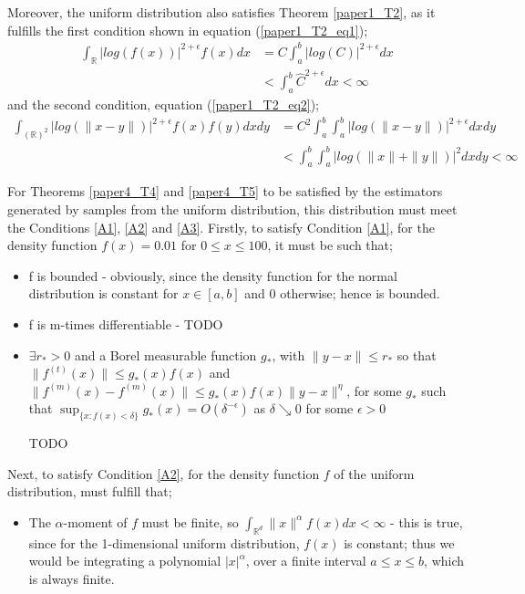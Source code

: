 \documentclass{article}
\begin{document}
Moreover, the uniform distribution also satisfies Theorem \ref{paper1_T2}, as it fulfills the first condition shown in equation (\ref{paper1_T2_eq1});
\begin{align} \nonumber
\int_{\mathbb{R}} | log(f(x))|^{2 + \epsilon} f(x) dx  &= C \int_{a}^{b} | log  (C)|^{2 + \epsilon} dx \\ \nonumber
&< \int_{a}^{b} \hat{C}^{2 + \epsilon} dx < \infty \nonumber
\end{align}
and the second condition, equation (\ref{paper1_T2_eq2});
\begin{align} \nonumber
\int_{(\mathbb{R})^2} | log(\|x-y\|)|^{2+ \epsilon} f(x) f(y) dx dy  &= C^2 \int_{a}^{b} \int_{a}^{b}| log(\|x-y\|)|^{2+ \epsilon} dx dy \\ \nonumber
&< \int_{a}^{b} \int_{a}^{b} | log(\|x\| + \|y\|)|^2 dx dy < \infty \nonumber
\end{align}

For Theorems \ref{paper4_T4} and \ref{paper4_T5} to be satisfied by the estimators generated by samples from the uniform distribution, this distribution must meet the Conditions \ref{A1}, \ref{A2} and \ref{A3}. 
Firstly, to satisfy Condition \ref{A1}, for the density function $f(x) = 0.01$ for $0 \leq x \leq 100$, it must be such that;
\begin{itemize}
\item f is bounded - obviously, since the density function for the normal distribution is constant for $x \in [a, b]$ and $0$ otherwise; hence is bounded.

\item f is m-times differentiable - TODO

\item $\exists r_{*} > 0$ and a Borel measurable function $g_{*}$, with $\|y-x\| \leq r_{*}$ so that $\|f^{(t)}(x)\| \leq g_{*}(x) f(x)$ and $\|f^{(m)}(x) - f^{(m)}(x)\| \leq g_{*}(x) f(x)\|y - x\|^{\eta}$, for some $g_{*}$ such that $\sup_{\{x : f(x) < \delta\}} g_{*}(x) = O(\delta^{-\epsilon})$ as $\delta \searrow 0$ for some $\epsilon >0$

TODO

\end{itemize}

Next, to satisfy Condition \ref{A2}, for the density function $f$ of the uniform distribution, must fulfill that;
\begin{itemize}
\item The $\alpha$-moment of $f$ must be finite, so $\int_{\mathbb{R}^{d}} \| x \|^{\alpha} f(x) dx < \infty$ - this is true, since for the 1-dimensional uniform distribution, $f(x)$ is constant; thus we would be integrating a polynomial $|x|^{\alpha}$, over a finite interval $a \leq x \leq b$, which is always finite.
\end{itemize}
\end{document}
